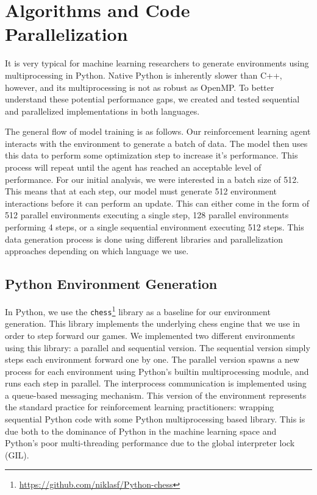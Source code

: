 \documentclass[12pt]{article}
\begin{document}
\section{Algorithms and Code Parallelization}\label{sec:algorithms-and-parallelization}

It is very typical for machine learning researchers to generate environments using multiprocessing in Python. Native Python is inherently slower than C++, however, and its multiprocessing is not as robust as OpenMP. To better understand these potential performance gaps, we created and tested sequential and parallelized implementations in both languages.

The general flow of model training is as follows. Our reinforcement learning agent interacts with the environment to generate a batch of data. The model then uses this data to perform some optimization step to increase it's performance. This process will repeat until the agent has reached an acceptable level of performance. For our initial analysis, we were interested in a batch size of 512. This means that at each step, our model must generate 512 environment interactions before it can perform an update. This can either come in the form of 512 parallel environments executing a single step, 128 parallel environments performing 4 steps, or a single sequential environment executing 512 steps. This data generation process is done using different libraries and parallelization approaches depending on which language we use. 
  
\subsection{Python Environment Generation}\label{subsec:Python-environment} 

In Python, we use the \texttt{chess}\footnote{\url{https://github.com/niklasf/Python-chess}} library as a baseline for our environment generation. This library implements the underlying chess engine that we use in order to step forward our games. We implemented two different environments using this library: a parallel and sequential version. The sequential version simply steps each environment forward one by one. The parallel version spawns a new process for each environment using Python's builtin multiprocessing module, and runs each step in parallel. The interprocess communication is implemented using a queue-based messaging mechanism. This version of the environment represents the standard practice for reinforcement learning practitioners: wrapping sequential Python code with some Python multiprocessing based library. This is due both to the dominance of Python in the machine learning space and Python's poor multi-threading performance due to the global interpreter lock (GIL).
\end{document}
